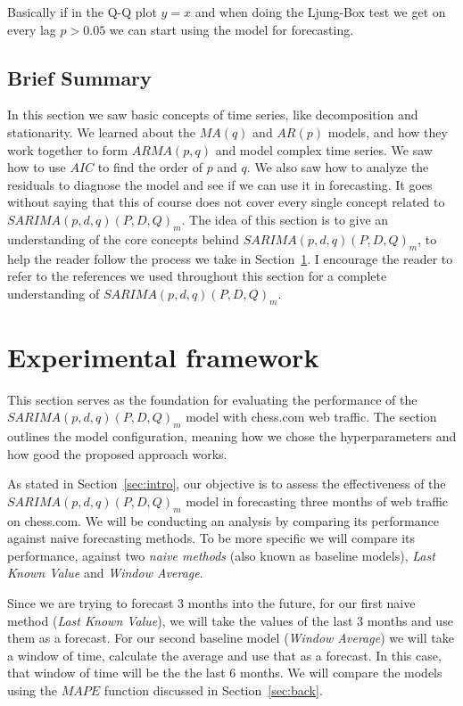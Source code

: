\documentclass[journal]{IEEEtran}
\begin{document}
Basically if in the Q-Q plot $y = x$ and when doing the Ljung-Box  test we get
on every lag $p > 0.05$ we can start using the model for forecasting.

\subsection{Brief Summary}

In this section we saw basic concepts of time series,  like decomposition and
stationarity. We learned about the $MA(q)$ and $AR(p)$ models, and how they
work together to form $ARMA(p,q)$ and model complex time series. We saw how to
use $AIC$ to find the order of $p$ and $q$. We also saw how to analyze the
residuals to diagnose the model and see if we can use it in forecasting. It
goes without saying that this of course does not cover every single concept
related to $SARIMA(p,d,q)(P,D,Q)_m$. The idea of this section is to give an
understanding of the core concepts behind $SARIMA(p,d,q)(P,D,Q)_m$, to help
the reader follow the process we take in Section~\ref{sec:exp}. I encourage
the reader to refer to the references we used throughout this section for a
complete understanding of $SARIMA(p,d,q)(P,D,Q)_m$.

\section{Experimental framework}\label{sec:exp}

This section serves as the foundation for evaluating the performance of the
$SARIMA(p,d,q)(P,D,Q)_m$ model with chess.com web traffic. The section outlines
the model configuration, meaning how we chose the hyperparameters and 
how good the proposed approach works.

As stated in Section~\ref{sec:intro}, our objective is to assess the effectiveness of
the $SARIMA(p,d,q)(P,D,Q)_m$ model in forecasting three months of web traffic
on chess.com. We will be conducting an analysis by comparing its performance
against naive forecasting methods. To be more specific we will compare its
performance, against two \emph{naive methods} (also known as baseline models),
\emph{Last Known Value} and \emph{Window Average}.

Since we are trying to forecast 3 months into the future, for our first naive
method (\emph{Last Known Value}), we will take the values of the last 3 months
and use them as a forecast. For our second baseline model (\emph{Window
Average}) we will take a window of time, calculate the average and use that as
a forecast. In this case, that window of time will be the the last 6 months.
We will compare the models using the $MAPE$ function discussed in
Section~\ref{sec:back}.
\end{document}
